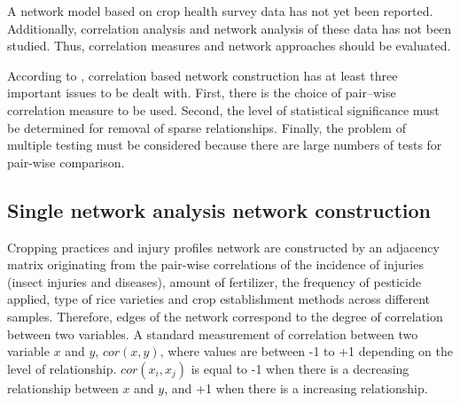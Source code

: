 
A network model based on crop health survey data has not yet been reported. Additionally, correlation analysis and network analysis of these data has not been studied. Thus, correlation measures and network approaches should be evaluated.

According to , correlation based network construction has at least three important issues to be dealt with. First, there is the choice of pair--wise correlation measure to be used. Second, the level of statistical significance must be determined for removal of sparse relationships. Finally, the problem of multiple testing must be considered because there are large numbers of tests for pair-wise comparison.




\subsection*{Single network analysis network construction}

Cropping practices and injury profiles network are constructed by an adjacency matrix originating from the pair-wise correlations of the incidence of injuries (insect injuries and diseases), amount of fertilizer, the frequency of pesticide applied, type of rice varieties and crop establishment methods across different samples. Therefore, edges of the network correspond to the degree of correlation between two variables. A standard measurement of correlation between two variable $x$ and $y$, $cor(x,y)$, where values are  between -1 to +1 depending on the level of relationship. $cor(x_{i}, x_{j})$ is equal to -1 when there is a decreasing relationship between $x$ and $y$, and +1 when there is a increasing relationship.

